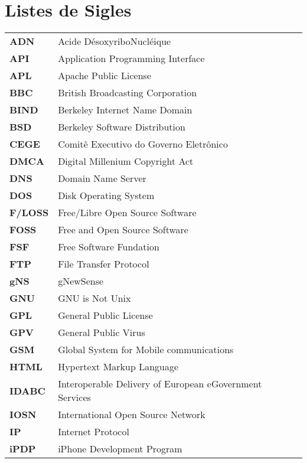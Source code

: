 \chapter*{Listes de Sigles}

\setcounter{LTchunksize}{10}

\begin{longtable}{p{3cm}p{12cm}l}
\rowcolor[gray]{.95}
\textbf{ADN} & Acide DésoxyriboNucléique\\
\textbf{API} & Application Programming Interface\\
\rowcolor[gray]{.95}
\textbf{APL} & Apache Public License\\
\textbf{BBC} & British Broadcasting Corporation\\
\rowcolor[gray]{.95}
\textbf{BIND} & Berkeley Internet Name Domain\\
\textbf{BSD} & Berkeley Software Distribution\\
\rowcolor[gray]{.95}
\textbf{CEGE} & Comitê Executivo do Governo Eletrônico\\
\textbf{DMCA} & Digital Millenium Copyright Act\\
\rowcolor[gray]{.95}
\textbf{DNS} & Domain Name Server\\
\textbf{DOS} & Disk Operating System\\
\rowcolor[gray]{.95}
\textbf{F/LOSS}	& Free/Libre Open Source Software\\
\textbf{FOSS} & Free and Open Source Software\\
\rowcolor[gray]{.95}
\textbf{FSF} & Free Software Fundation\\
\textbf{FTP} & File Transfer Protocol\\
\rowcolor[gray]{.95}
\textbf{gNS} & gNewSense\\
\textbf{GNU} & GNU is Not Unix\\
\rowcolor[gray]{.95}
\textbf{GPL} & General Public License\\
\textbf{GPV} & General Public Virus\\
\rowcolor[gray]{.95}
\textbf{GSM} & Global System for Mobile communications\\
\textbf{HTML} & Hypertext Markup Language\\
\rowcolor[gray]{.95}
\textbf{IDABC} & Interoperable Delivery of European eGovernment Services\\
\textbf{IOSN} & International Open Source Network\\
\textbf{IP} & Internet Protocol\\
\rowcolor[gray]{.95}
\textbf{iPDP} & iPhone Development Program\\

\end{longtable}
